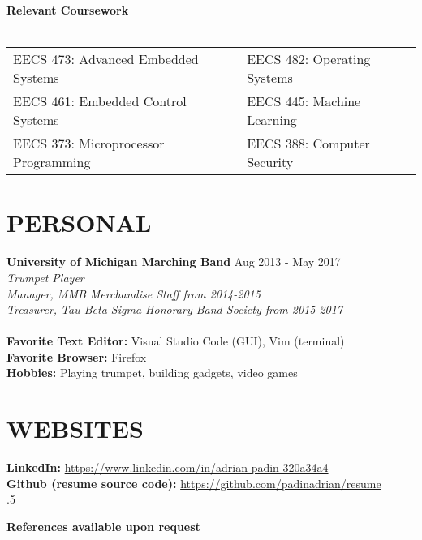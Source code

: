 \documentclass[margin,11pt]{res}
\begin{document}
\begin{resume}
\textbf{Relevant Coursework}\\
\vspace{-10pt}
\\
\vspace{-10pt}
\begin{tabular}{l l}
    EECS 473: Advanced Embedded Systems & EECS 482: Operating Systems\\
    EECS 461: Embedded Control Systems & EECS 445: Machine Learning\\
    EECS 373: Microprocessor Programming & EECS 388: Computer Security\\
\end{tabular}

\pagebreak

\section{PERSONAL}
\textbf{University of Michigan Marching Band} \hfill Aug 2013 - May 2017\\
\textsl{Trumpet Player}\\
\textsl{Manager, MMB Merchandise Staff from 2014-2015}\\
\textsl{Treasurer, Tau Beta Sigma Honorary Band Society from 2015-2017}\\
\\
\textbf{Favorite Text Editor:} Visual Studio Code (GUI), Vim (terminal)\\
\textbf{Favorite Browser:} Firefox\\
\textbf{Hobbies:} Playing trumpet, building gadgets, video games

\section{WEBSITES}
\textbf{LinkedIn:}
\href{https://www.linkedin.com/in/adrian-padin-320a34a4}{https://www.linkedin.com/in/adrian-padin-320a34a4}\\
\textbf{Github (resume source code):}
\href{https://github.com/padinadrian/resume}{https://github.com/padinadrian/resume}\\

\vspace{10pt}
\moveleft.5\hoffset\centerline{\large\bf References available upon request}

\end{resume}
\end{document}
